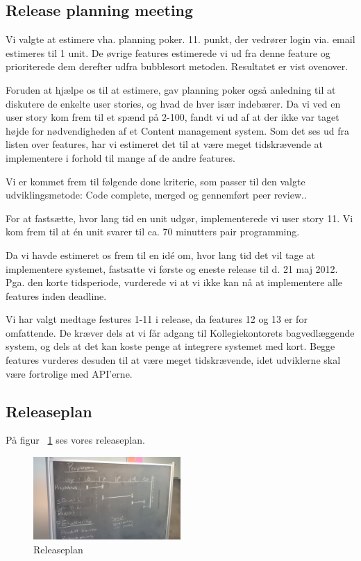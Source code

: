 \documentclass[12pt, a4paper]{report}
\begin{document}
\subsection{Release planning meeting}

Vi valgte at estimere vha. planning poker. 11. punkt, der vedrører login via. email estimeres til 1 unit. De øvrige features estimerede vi  ud fra denne feature og prioriterede dem derefter udfra bubblesort metoden. Resultatet er vist ovenover.

Foruden at hjælpe os til at estimere, gav planning poker også anledning til at diskutere de enkelte user stories, og hvad de hver især indebærer. Da vi ved en user story kom frem til et spænd på 2-100, fandt vi ud af at der ikke var taget højde for nødvendigheden af et Content management system. Som det ses ud fra listen over features, har vi estimeret det til at være meget tidskrævende at implementere i forhold til mange af de andre features.

Vi er kommet frem til følgende done kriterie, som passer til den valgte udviklingsmetode: Code complete, merged og gennemført peer review..

For at fastsætte, hvor lang tid en unit udgør, implementerede vi user story 11. Vi kom frem til at én unit svarer til ca. 70 minutters pair programming.

Da vi havde estimeret os frem til en idé om, hvor lang tid det vil tage at implementere systemet, fastsatte vi første og eneste release til d. 21 maj 2012. Pga. den korte tidsperiode, vurderede vi at vi ikke kan nå at implementere alle features inden deadline.

Vi har valgt medtage festures 1-11 i release, da features 12 og 13 er for omfattende. De kræver dels at vi får adgang til Kollegiekontorets bagvedlæggende system, og dels at det kan koste penge at integrere systemet med kort. Begge features vurderes desuden til at være meget tidskrævende, idet udviklerne skal være fortrolige med API’erne.

\subsection{Releaseplan}
På figur ~\ref{release_plan} ses vores releaseplan.
\begin{figure}[ht]
\centering
\includegraphics[width=0.5\textwidth]{releaseplan}
\caption{Releaseplan}
\label{release_plan}
\end{figure}
\end{document}
